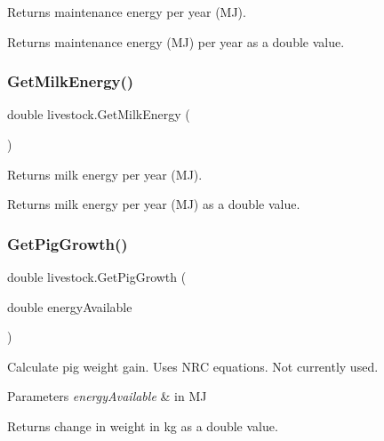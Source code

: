 Returns maintenance energy per year (MJ). 

\begin{DoxyReturn}{Returns}
maintenance energy (MJ) per year as a double value. 
\end{DoxyReturn}
\mbox{\label{classlivestock_a3769db690d5b53d96e92a5497b17bcd2}} 
\subsubsection{\texorpdfstring{GetMilkEnergy()}{GetMilkEnergy()}}
{\footnotesize\ttfamily double livestock.\+Get\+Milk\+Energy (\begin{DoxyParamCaption}{ }\end{DoxyParamCaption})\hspace{0.3cm}{\ttfamily [inline]}}



Returns milk energy per year (MJ). 

\begin{DoxyReturn}{Returns}
milk energy per year (MJ) as a double value. 
\end{DoxyReturn}
\mbox{\label{classlivestock_adffc58e33fd0d59a46ab0b49ce8c0c7b}} 
\subsubsection{\texorpdfstring{GetPigGrowth()}{GetPigGrowth()}}
{\footnotesize\ttfamily double livestock.\+Get\+Pig\+Growth (\begin{DoxyParamCaption}\item[{double}]{energy\+Available }\end{DoxyParamCaption})\hspace{0.3cm}{\ttfamily [inline]}}



Calculate pig weight gain. Uses N\+RC equations. Not currently used. 


\begin{DoxyParams}{Parameters}
{\em energy\+Available} & in MJ \\
\hline
\end{DoxyParams}
\begin{DoxyReturn}{Returns}
change in weight in kg as a double value. 
\end{DoxyReturn}
\mbox{\label{classlivestock_ad338831b82101e04caa927a1e3c77d0b}} 
